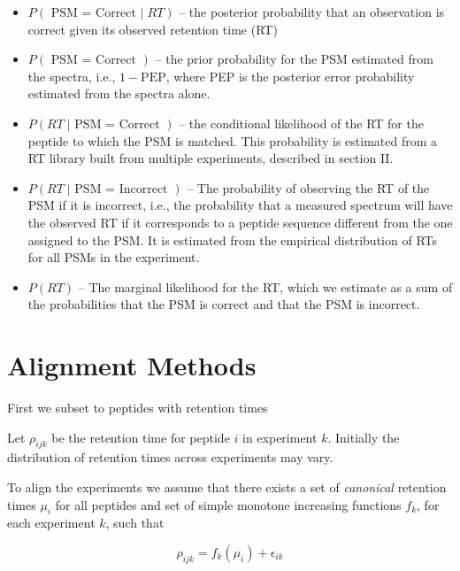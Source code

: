 \begin{spacing}{1.55}
\begin{itemize}
\item $P(\mbox{ PSM = Correct }|\;RT)$ -- the posterior probability that an observation is correct given its observed retention time (RT)
\item $P(\mbox{ PSM = Correct })$ -- the prior probability for the PSM estimated from the spectra, i.e., $1- \mbox{PEP}$, where PEP is the posterior error probability estimated from the spectra alone. 
\item $P(RT\; | \mbox{ PSM = Correct })$ -- the conditional likelihood of the RT for the peptide to which the PSM is matched. This probability is estimated from a RT library built from multiple experiments, described in section II. 
\item $P(RT\; | \mbox{ PSM = Incorrect })$ -- The probability of observing the RT of the PSM if it is incorrect, i.e., the probability that a measured spectrum will have the observed RT if it corresponds to a peptide sequence different from the one assigned to the PSM. It is estimated from the empirical distribution of RTs for all PSMs in the experiment.
\item $P(RT)$ -- The marginal likelihood for the RT, which we estimate as a sum of the probabilities that the PSM is correct and that the PSM is incorrect.
\end{itemize}



\section{Alignment Methods}

First we subset to peptides with retention times 

Let $\rho_{ijk}$ be the retention time for peptide $i$ in experiment $k$.  Initially the distribution of retention times across experiments may vary.

To align the experiments we assume that there exists a set of \emph{canonical} retention times $\mu_i$ for all peptides and set of simple monotone increasing functions $f_k$, for each experiment $k$, such that

$$\rho_{ijk} = f_k(\mu_i) + \epsilon_{ik}$$


\end{spacing}
